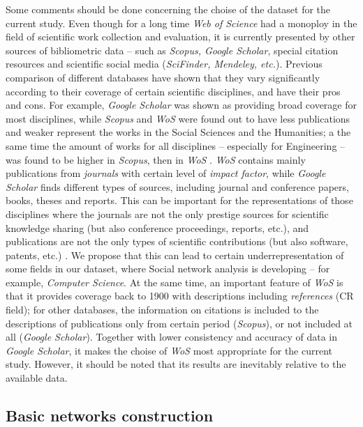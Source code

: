 \documentclass[11pt]{article} %
\begin{document}
Some comments should be done concerning the choise of the dataset for the current study. Even though for a long time \textit{Web of Science} had a monoploy in the field of scientific work collection and evaluation, it is currently presented by other sources of bibliometric data -- such as \textit{Scopus, Google Scholar}, special citation resources and scientific social media (\textit{SciFinder, Mendeley, etc.}). Previous comparison of different databases have shown that they vary significantly according to their coverage of certain scientific disciplines, and have their pros and cons. For example, \textit{Google Scholar} was shown as providing broad coverage for most disciplines, while \textit{Scopus} and \textit{WoS} were found out to have less publications and weaker represent the works in the Social Sciences and the Humanities; a the same time the amount of works for all disciplines -- especially for Engineering -- was found to be higher in \textit{Scopus}, then in \textit{WoS} \citep{hilbert, harzing, martin}. \textit{WoS} contains mainly publications from \textit{journals} with certain level of \textit{impact factor}, while \textit{Google Scholar} finds different types of sources, including journal and conference papers, books, theses and reports. This can be important for the representations of those disciplines where the journals are not the only prestige sources for scientific knowledge sharing (but also conference proceedings, reports, etc.), and publications are not the only types of scientific contributions (but also software, patents, etc.) \citep{franceschet}. We propose that this can lead to certain underrepresentation of some fields in our dataset, where Social network analysis is developing -- for example, \textit{Computer Science}. At the same time, an important feature of \textit{WoS} is that it provides coverage back to 1900 with descriptions including \textit{references} (CR field); for other databases, the information on citations is included to the descriptions of publications only from certain period (\textit{Scopus}), or not included at all (\textit{Google Scholar}). Together with lower consistency and accuracy of data in \textit{Google Scholar}, it makes the choise of \textit{WoS} most appropriate for the current study. However, it should be noted that its results are inevitably relative to the available data.  

\subsection{Basic networks construction}
\end{document}
